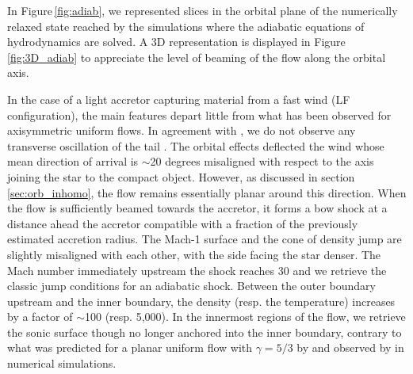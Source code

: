 \documentclass{aa}
\begin{document}
In Figure\,\ref{fig:adiab}, we represented slices in the orbital plane of the numerically relaxed state reached by the simulations where the adiabatic equations of hydrodynamics are solved. A 3D representation is displayed in Figure\,\ref{fig:3D_adiab} to appreciate the level of beaming of the flow along the orbital axis.

In the case of a light accretor capturing material from a fast wind (LF configuration), the main features depart little from what has been observed for axisymmetric uniform flows. In agreement with \cite{Blondin:2012vf}, we do not observe any transverse oscillation of the tail \citep[the so-called "flip-flop instability" which arises in 2D polar numerical setups,][]{Foglizzo2005}. The orbital effects deflected the wind whose mean direction of arrival is $\sim$20 degrees misaligned with respect to the axis joining the star to the compact object. However, as discussed in section\,\ref{sec:orb_inhomo}, the flow remains essentially planar around this direction. When the flow is sufficiently beamed towards the accretor, it forms a bow shock at a distance ahead the accretor compatible with a fraction of the previously estimated accretion radius. The Mach-1 surface and the cone of density jump are slightly misaligned with each other, with the side facing the star denser. The Mach number immediately upstream the shock reaches 30 and we retrieve the classic jump conditions for an adiabatic shock. Between the outer boundary upstream and the inner boundary, the density (resp. the temperature) increases by a factor of $\sim$100 (resp. 5,000). In the innermost regions of the flow, we retrieve the sonic surface though no longer anchored into the inner boundary, contrary to what was predicted for a planar uniform flow with $\gamma=5/3$ by \cite{Foglizzo1996} and observed by \cite{ElMellah2015} in numerical simulations.
\end{document}
